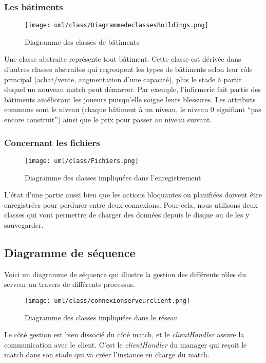 \documentclass[a4paper,titlepage]{scrreprt}
\begin{document}
  \subsubsection{Les bâtiments}
    \begin{figure}[H]
    \center
    \texttt{[image: uml/class/DiagrammedeclassesBuildings.png]}
    \caption{Diagramme des classes de bâtiments}
    \end{figure}	
  Une classe abstraite représente tout bâtiment. Cette classe est dérivée dans d'autres classes abstraites
  qui regroupent les types de bâtiments selon leur rôle principal (achat/vente, augmentation
  d'une capacité), plus le stade à partir duquel un nouveau match peut démarrer. Par exemple, l'\gls{infirmerie} fait partie des bâtiments
  améliorant les joueurs puisqu'elle soigne leurs blessures.
  Les attributs communs sont le niveau (chaque bâtiment à un niveau, le niveau 0
  signifiant \enquote{pas encore construit}) ainsi que le prix pour passer au niveau suivant.
  \subsubsection{Concernant les fichiers}
    \begin{figure}[H]
    \center
    \texttt{[image: uml/class/Fichiers.png]}
    \caption{Diagramme des classes impliquées dans l'enregistrement}
    \end{figure}	
  L'état d'une partie aussi bien que les actions bloquantes ou planifiées doivent
  être enregistrées pour perdurer entre deux connexions. Pour cela, nous utilisons
  deux classes qui vont permettre de charger des données depuis le disque ou
  de les y sauvegarder.
  \subsection{Diagramme de séquence}
  Voici un diagramme de séquence qui illustre la gestion des différents
  rôles du serveur au travers de différents processus.
    \begin{figure}[H]
    \center
    \texttt{[image: uml/class/connexionserveurclient.png]}
    \caption{Diagramme des classes impliquées dans le réseau}
    \end{figure}	
  Le côté gestion est bien dissocié du côté match, et le \emph{clientHandler} assure la communication avec le client.
  C'est le \emph{clientHandler} du manager qui reçoit le match dans son stade
  qui va créer l'instance en charge du match.
  

\printindex
\end{document}
